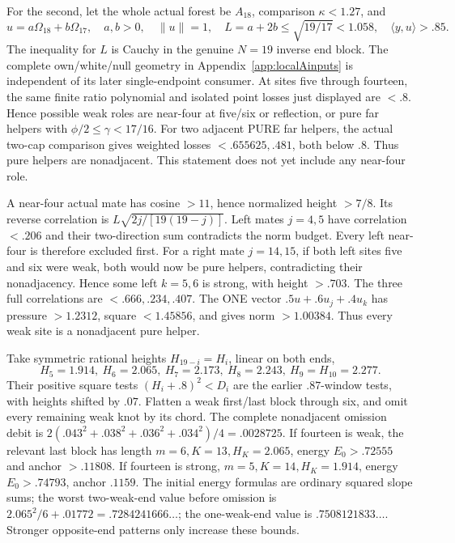 \documentclass[11pt]{article}
\theoremstyle{definition}
\theoremstyle{remark}
\newcommand{\ip}[2]{\langle #1,#2\rangle}
\newcommand{\norm}[1]{\lVert #1\rVert}
\begin{document}
For the second, let the whole actual forest be \(A_{18}\), comparison
\(\kappa<1.27\), and
\[
 u=a\Omega_{18}+b\Omega_{17},\quad a,b>0,\quad
 \norm u=1,\quad L=a+2b\leq\sqrt{19/17}<1.058,\quad
 \ip yu>.85 .
\]
The inequality for \(L\) is Cauchy in the genuine \(N=19\)
inverse end block.
The complete own/white/null geometry in
Appendix~\ref{app:localAinputs} is independent of its later
single-endpoint consumer.
At sites five through fourteen, the same finite ratio polynomial
and isolated point losses just displayed are \(<.8\).
Hence possible weak roles are near-four at five/six or reflection,
or pure far helpers with \(\phi/2\leq\gamma<17/16\).
For two adjacent PURE far helpers, the actual two-cap comparison
gives weighted losses \(<.655625,.481\), both below \(.8\).
Thus pure helpers are nonadjacent. This statement does not yet
include any near-four role.

A near-four actual mate has cosine \(>11\), hence normalized
height \(>7/8\). Its reverse correlation is
\(L\sqrt{2j/[19(19-j)]}\).
Left mates \(j=4,5\) have correlation \(<.206\) and their
two-direction sum contradicts the norm budget.
Every left near-four is therefore excluded first.
For a right mate \(j=14,15\), if both left sites five and six
were weak, both would now be pure helpers, contradicting their
nonadjacency. Hence some left \(k=5,6\) is strong, with height \(>.703\).
The three full correlations are \(<.666,.234,.407\).
The ONE vector \(.5u+.6u_j+.4u_k\) has pressure \(>1.2312\),
square \(<1.45856\), and gives norm \(>1.00384\).
Thus every weak site is a nonadjacent pure helper.

Take symmetric rational heights \(H_{19-i}=H_i\), linear on both ends,
\[
 H_5=1.914,\ H_6=2.065,\ H_7=2.173,\ H_8=2.243,\
 H_9=H_{10}=2.277 .
\]
Their positive square tests \((H_i+.8)^2<D_i\) are the
earlier \(.87\)-window tests, with heights shifted by \(.07\).
Flatten a weak first/last block through six, and omit every remaining
weak knot by its chord.
The complete nonadjacent omission debit is
\(2(.043^2+.038^2+.036^2+.034^2)/4=.0028725\).
If fourteen is weak, the relevant last block has length
\(m=6,K=13,H_K=2.065\), energy \(E_0>.72555\) and
anchor \(>.11808\).
If fourteen is strong, \(m=5,K=14,H_K=1.914\),
energy \(E_0>.74793\), anchor \(.1159\).
The initial energy formulas are ordinary squared slope sums;
the worst two-weak-end value before omission is
\(2.065^2/6+.01772=.7284241666\ldots\);
the one-weak-end value is \(.7508121833\ldots\).
Stronger opposite-end patterns only increase these bounds.
\end{document}
